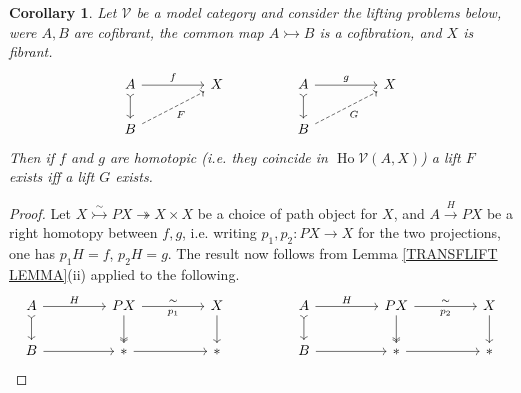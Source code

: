 \documentclass[a4paper,10pt
,draft
]{article}%
\numberwithin{equation}{section}
\numberwithin{figure}{section}
\newtheorem{corollary}[equation]{Corollary}%
\theoremstyle{definition} %
\DeclareMathOperator{\Ho}{Ho}
\newcommand{\V}{\ensuremath{\mathcal V}}
\newcommand{\1}{\ensuremath{\mathbbm 1}}%
\begin{document}
\begin{corollary}\label{LIFTEQUIV COR}
Let $\V$ be a model category and
consider the lifting problems below, were $A,B$ are cofibrant, 
the common map $A \rightarrowtail B$ is a cofibration, and $X$ is fibrant.
\begin{equation}
\begin{tikzcd}[column sep = 45pt]
	A
	\ar[rightarrowtail]{d}
	\arrow{r}{f}
&
	X
&%
	A
	\ar[rightarrowtail]{d}
	\arrow{r}{g}
&
	X
\\
	B \ar[dashed]{ru}[swap]{F}
&
&%
	B \ar[dashed]{ru}[swap]{G}
&
\end{tikzcd}
\end{equation}
Then if $f$ and $g$ are homotopic 
(i.e. they coincide in $\Ho \V(A,X)$)
a lift $F$ exists iff a lift $G$ exists.
\end{corollary}

\begin{proof}
Let 
$X \overset{\sim}{\rightarrowtail} PX 
\twoheadrightarrow X \times X$
be a choice of path object for $X$,
and $A \xrightarrow{H} PX$
be a right homotopy between $f,g$,
i.e. writing $p_1,p_2 \colon PX \to X$ for the two projections,
one has
$p_1H=f$, $p_2H=g$.
The result now follows from Lemma \ref{TRANSFLIFT LEMMA}(ii)
applied to the following.
\begin{equation}
\begin{tikzcd}[column sep = 45pt]
	A
	\ar[rightarrowtail]{d}
	\arrow{r}{H}
&
	PX
	\arrow[twoheadrightarrow]{d} \ar{r}{\sim}[swap]{p_1}
&
	X \ar{d}
&%
	A
	\ar[rightarrowtail]{d}
	\arrow{r}{H}
&
	PX
	\arrow[twoheadrightarrow]{d} \ar{r}{\sim}[swap]{p_2}
&
	X \ar{d}
\\
	B
	\arrow{r}
&
	\**\ar{r}
&
	\**
&%
	B
	\arrow{r}
&
	\**\ar{r}
&
	\**
\end{tikzcd}
\end{equation}
\end{proof}
\end{document}
